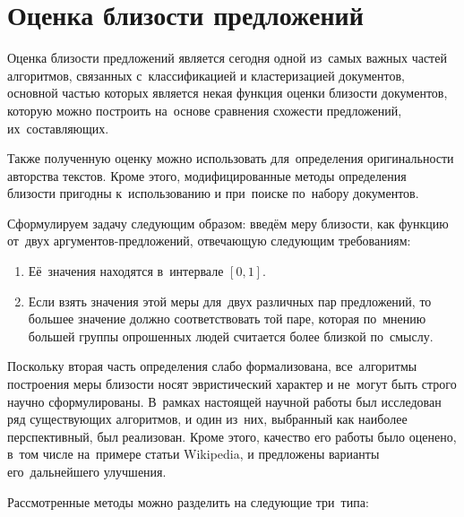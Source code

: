 \section{Оценка близости предложений}

Оценка близости предложений является сегодня одной из~самых важных частей алгоритмов,
 связанных с~классификацией и кластеризацией документов\cite{textminingsurvey}, 
основной частью которых является некая функция оценки близости документов,
которую можно построить на~основе сравнения схожести предложений, их~составляющих.

Также полученную оценку можно использовать для~определения оригинальности
авторства текстов.
Кроме этого, модифицированные методы определения близости пригодны к~использованию и при~поиске по~набору документов.

Сформулируем задачу следующим образом:
введём меру близости, как функцию от~двух аргументов-предложений, отвечающую следующим требованиям:

\begin{enumerate}

\item {
Её~значения находятся в~интервале $[0,1]$.
}

\item {
Если взять значения этой меры для~двух различных пар предложений, 
то большее значение должно соответствовать той паре, которая по~мнению большей группы опрошенных людей считается более близкой по~смыслу.
}

\end{enumerate}

Поскольку вторая часть определения слабо формализована, 
все~алгоритмы построения меры близости носят эвристический характер и не~могут быть строго научно сформулированы.
В~рамках настоящей научной работы был исследован ряд существующих алгоритмов,
и один из~них, выбранный как наиболее перспективный, был реализован.
Кроме этого, качество его работы было оценено, в~том числе на~примере статьи Wikipedia, 
и предложены варианты его~дальнейшего улучшения.

Рассмотренные методы можно разделить на следующие три~типа:

